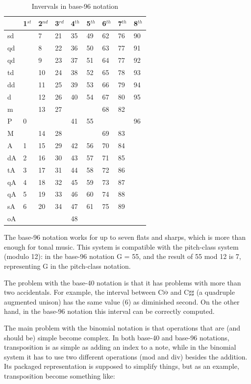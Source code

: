 \documentclass{article}
\begin{document}
\begin{table}
  \centering
  \begin{tabular}{l|llllllll}
    & 1$^{st}$& 2$^{nd}$& 3$^{rd}$& 4$^{th}$& 5$^{th}$& 6$^{th}$& 7$^{th}$& 8$^{th}$ \\
    \hline
    sd  &  & 7&21&35&49&62&76&90 \\
    qd  &  & 8&22&36&50&63&77&91 \\
    qd  &  & 9&23&37&51&64&77&92 \\
    td  &  &10&24&38&52&65&78&93 \\
    dd  &  &11&25&39&53&66&79&94 \\
    d   &  &12&26&40&54&67&80&95 \\
    m   &  &13&27&  &  &68&82&   \\
    P   & 0&  &  &41&55&  &  &96 \\
    M   &  &14&28&  &  &69&83&   \\
    A   & 1&15&29&42&56&70&84&   \\
    dA  & 2&16&30&43&57&71&85&   \\
    tA  & 3&17&31&44&58&72&86&   \\
    qA  & 4&18&32&45&59&73&87&   \\
    qA  & 5&19&33&46&60&74&88&   \\
    sA  & 6&20&34&47&61&75&89&   \\
    oA  &  &  &  &48&  &  &  &   
  \end{tabular}
  \caption{Invervals in base-96 notation}
  \label{tab:jama-intervalos}
\end{table}

The base-96 notation works for up to seven flats and sharps, which is
more than enough for tonal music. This system is compatible with the
pitch-class system (modulo 12): in the base-96 notation G = 55, and
the result of 55 mod 12 is 7, representing G in the pitch-class
notation. 

The problem with the base-40 notation is that it has problems with
more than two accidentals. For example, the interval between
C$\flat\flat$ and C$\sharp\sharp$ (a quadruple augmented unison) has
the same value (6) as diminished second. On the other hand, in the
base-96 notation this interval can be correctly computed.

The main problem with the binomial notation is that operations that
are (and should be) simple become complex. In both base-40 and base-96
notations, transposition is as simple as adding an index to a note, while
in the binomial system it has to use two different operations (mod and
div) besides the addition. Its packaged representation is supposed to
simplify things, but as an example, transposition become something
like:
\end{document}
